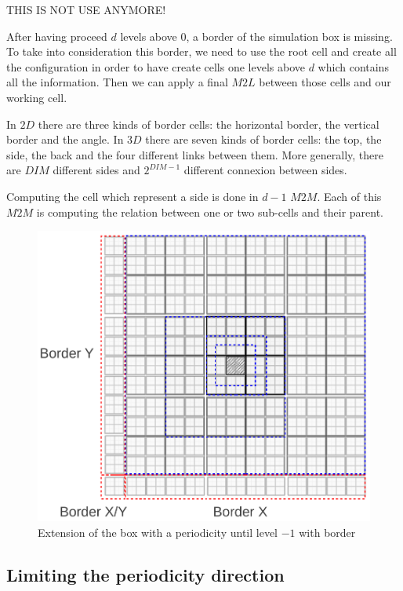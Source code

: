 \documentclass[12pt]{article} %
\begin{document}
THIS IS NOT USE ANYMORE!

After having proceed $d$ levels above $0$, a border of the simulation box is missing.
To take into consideration this border, we need to use the root cell and create all the configuration in order to have create
cells one levels above $d$ which contains all the information.
Then we can apply a final $M2L$ between those cells and our working cell.

In $2D$ there are three kinds of border cells: the horizontal border, the vertical border and the angle.
In $3D$ there are seven kinds of border cells: the top, the side, the back and the four different links between them.
More generally, there are $DIM$ different sides and $2^{DIM-1}$ different connexion between sides.

Computing the cell which represent a side is done in $d-1$ $M2M$.
Each of this $M2M$ is computing the relation between one or two sub-cells and their parent.

\begin{figure}[h]
\centering
\includegraphics[scale=0.45]{Images/Border}
\caption{Extension of the box with a periodicity until level $-1$ with border}
\end{figure}

\subsection{Limiting the periodicity direction}
\end{document}
